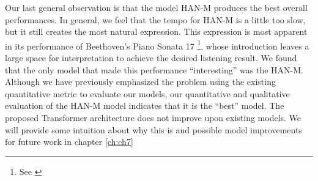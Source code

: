 Our last general observation is that the \vnet{} model HAN-M produces the best overall performances. In general, we feel that the tempo for HAN-M is a little too slow, but it still creates the most natural expression. This expression is most apparent in its performance of Beethoven's Piano Sonata 17%
\footnote{See \href{https://ui.neptune.ai/richt3211/thesis/e/THESIS-162/artifacts}{}}, whose introduction leaves a large space for interpretation to achieve the desired listening result. We found that the only model that made this performance ``interesting'' was the HAN-M. Although we have previously emphasized the problem using the existing quantitative metric to evaluate our models, our quantitative and qualitative evaluation of the HAN-M model indicates that it is the ``best'' model. The proposed Transformer architecture does not improve upon existing models. We will provide some intuition about why this is and possible model improvements for future work in chapter \ref{ch:ch7}





